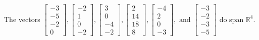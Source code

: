 \begin{exercise}
\begin{exerciseStatement}
  \end{exerciseStatement}
  \begin{exerciseAnswer}
   The vectors \(\left[\begin{array}{r}
-3 \\
-5 \\
-2 \\
0
\end{array}\right] , \left[\begin{array}{r}
-2 \\
1 \\
0 \\
-2
\end{array}\right] , \left[\begin{array}{r}
3 \\
0 \\
-4 \\
-2
\end{array}\right] , \left[\begin{array}{r}
2 \\
14 \\
18 \\
8
\end{array}\right] , \left[\begin{array}{r}
-4 \\
2 \\
0 \\
-3
\end{array}\right] , \text{ and } \left[\begin{array}{r}
-3 \\
-2 \\
-3 \\
-5
\end{array}\right]\) 
  	 do  
	span \(\mathbb{R}^4\).
  


  \end{exerciseAnswer}
\end{exercise}